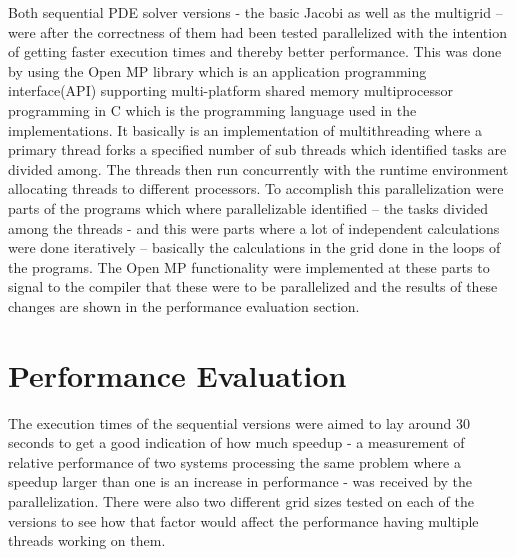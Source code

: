\documentclass{article}
\begin{document}
Both sequential PDE solver versions - the basic Jacobi as well as the multigrid – were after the correctness of them had been tested parallelized with the intention of getting faster execution times and thereby better performance. This was done by using the Open MP library which is an application programming interface(API) supporting multi-platform shared memory multiprocessor programming in C which is the programming language used in the implementations. It basically is an implementation of multithreading where a primary thread forks a specified number of sub threads which identified tasks are divided among. The threads then run concurrently with the runtime environment allocating threads to different processors. To accomplish this parallelization were parts of the programs which where parallelizable identified – the tasks divided among the threads - and this were parts where a lot of independent calculations were done iteratively – basically the calculations in the grid done in the loops of the programs. The Open MP functionality were implemented at these parts to signal to the compiler that these were to be parallelized and the results of these changes are shown in the performance evaluation section.

\section{Performance Evaluation}\label{performanceevaluation}


The execution times of the sequential versions were aimed to lay around 30 seconds to get a good indication of how much speedup - a measurement of relative performance of two systems processing the same problem where a speedup larger than one is an increase in performance - was received by the parallelization. There were also two different grid sizes tested on each of the versions to see how that factor would affect the performance having multiple threads working on them. 
\end{document}
